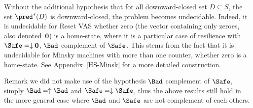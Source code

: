 Without the additional hypothesis that
for all downward-closed set $D \subseteq S$, the set $\pred^*(D)$ is downward-closed, the problem becomes undecidable. Indeed, it is 
undecidable for Reset 
VAS whether zero (the vector containing only zeroes, also denoted~$ \textbf{0}$) is a home-state, where it is a particular case of resilience with $\Safe = \downarrow \textbf{0}$, $\Bad$ complement of $\Safe$. This stems from the fact that it is undecidable for Minsky machines with more than one counter, whether zero is a home-state. See Appendix~\ref{HS-Minsk} for a more detailed construction.


Remark we did not make use of the hypothesis $\Bad$ complement of $\Safe$, simply 
$\Bad=\uparrow \Bad$ and $\Safe=\downarrow \Safe$, thus 
the above results still hold in the more general case where $\Bad$ and $\Safe$ are not complement of each others.


